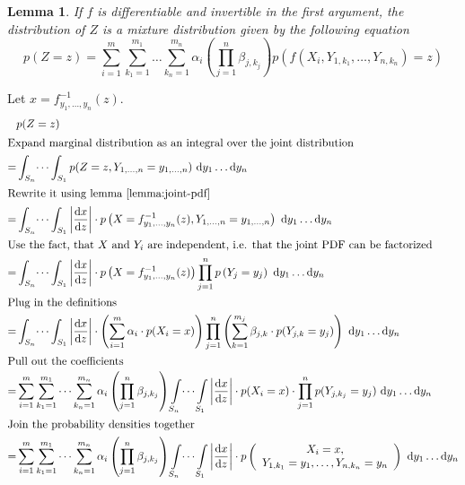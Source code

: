 \documentclass[11pt,a4paper]{book}
\newtheorem{lemma}{Lemma}
\newcommand{\ontopof}[2]{
  \begin{array}{c}
    #1,\\#2
  \end{array}
}
\begin{document}
\begin{lemma}
  \label{lemma:mixture}
  If $f$ is differentiable and invertible in the first argument, the
  distribution of $Z$ is a mixture distribution given by the following equation
  \begin{equation*}
    p(Z = z) = \sum_{i = 1}^{m} \sum_{k_{1} = 1}^{m_{1}} \dots \sum_{k_{n} = 1}^{m_{n}} \alpha_{i} \left( \prod_{j = 1}^{n} \beta_{j,k_{j}} \right) p(f(X_{i}, Y_{1,k_{1}}, \dots, Y_{n,k_{n}}) = z)
  \end{equation*}
\end{lemma}
\begin{proof2}
  Let $x = f_{y_{1}, \dots, y_{n}}^{-1}(z)$.
  \begin{align*}
    & p(Z = z)\\
    \intertext{Expand marginal distribution as an integral over the joint distribution}
    = & \int_{S_{n}} \dots \int_{S_{1}} p(Z = z, Y_{1, \dots, n} = y_{1, \dots, n})~\mathrm{d}y_{1}\dots \mathrm{d}y_{n}\\
    \intertext{Rewrite it using lemma \ref{lemma:joint-pdf}}
    = & \int_{S_{n}} \dots \int_{S_{1}} \left| \frac{\mathrm{d}x}{\mathrm{d}z} \right| \cdot p\left(X = f_{y_{1}, \dots, y_{n}}^{-1}(z), Y_{1, \dots, n} = y_{1, \dots, n}\right)~\mathrm{d}y_{1}\dots \mathrm{d}y_{n}\\
    \intertext{Use the fact, that $X$ and $Y_{i}$ are independent, i.e. that the joint PDF can be factorized}
    = & \int_{S_{n}} \dots \int_{S_{1}} \left| \frac{\mathrm{d}x}{\mathrm{d}z} \right| \cdot p\left(X = f_{y_{1}, \dots, y_{n}}^{-1}(z)\right) \prod_{j = 1}^{n} p\left(Y_{j} = y_{j}\right)~\mathrm{d}y_{1}\dots \mathrm{d}y_{n}\\
    \intertext{Plug in the definitions}
    = & \int_{S_{n}} \dots \int_{S_{1}} \left| \frac{\mathrm{d}x}{\mathrm{d}z} \right| \cdot \left(\sum_{i = 1}^{m} \alpha_{i} \cdot p(X_{i} = x)\right) \prod_{j = 1}^{n} \left(\sum_{k = 1}^{m_{j}} \beta_{j,k} \cdot p(Y_{j,k} = y_{j})\right)~\mathrm{d}y_{1}\dots \mathrm{d}y_{n}\\
    \intertext{Pull out the coefficients}
    = & \sum_{i = 1}^{m} \sum_{k_{1} = 1}^{m_{1}} \dots \sum_{k_{n} = 1}^{m_{n}} \alpha_{i} \left( \prod_{j = 1}^{n} \beta_{j,k_{j}} \right) \int\limits_{S_{n}} \dots \int\limits_{S_{1}} \left| \frac{\mathrm{d}x}{\mathrm{d}z} \right| \cdot p(X_{i} = x) \cdot \prod_{j = 1}^{n} p(Y_{j,k_{j}} = y_{j})~\mathrm{d}y_{1}\dots \mathrm{d}y_{n}\\
    \intertext{Join the probability densities together}
    = & \sum_{i = 1}^{m} \sum_{k_{1} = 1}^{m_{1}} \dots \sum_{k_{n} = 1}^{m_{n}} \alpha_{i} \left( \prod_{j = 1}^{n} \beta_{j,k_{j}} \right) \int\limits_{S_{n}} \dots \int\limits_{S_{1}} \left| \frac{\mathrm{d}x}{\mathrm{d}z} \right| \cdot p\left( \ontopof{X_{i} = x}{Y_{1,k_{1}} = y_{1}, \dots, Y_{n,k_{n}} = y_{n}} \right)~\mathrm{d}y_{1}\dots \mathrm{d}y_{n}\\

\end{align*}
\end{proof2}
\end{document}
